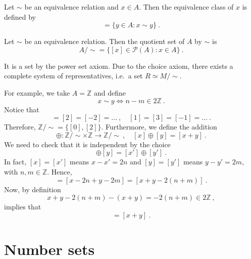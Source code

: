     \begin{definition}
        Let $\sim$ be an equivalence relation and $x \in A$. Then the equivalence class of $x$ is defined by 
        \begin{equation*}
            [x] = \{y \in A \colon x \sim y \} ~.
        \end{equation*}
    \end{definition}

    \begin{definition}
        Let $\sim$ be an equivalence relation. Then the quotient set of $A$ by $\sim$ is 
        \begin{equation*}
            A / \sim = \{[x] \in \mathcal P(A) \colon x \in A \} ~.
        \end{equation*}
    \end{definition}

    It is a set by the power set axiom. Due to the choice axiom, there exists a complete system of representatives, i.e.~a set $R \simeq M / \sim$.

    For example, we take $A = \mathbb Z$ and define 
    \begin{equation*}
        x \sim y \Leftrightarrow n - m \in 2 \mathbb Z ~.
    \end{equation*}
    Notice that 
    \begin{equation*}
        [0] = [2] = [-2] = \ldots ~, \quad [1] = [3] = [-1] = \ldots ~.
    \end{equation*}
    Therefore, $\mathbb Z / \sim = \{[0], [2]\}$. Furthermore, we define the addition 
    \begin{equation*}
        \oplus \colon \mathbb Z / \sim \times \mathbb Z \rightarrow \mathbb Z / \sim ~, \quad [x] \oplus [y] = [x+y] ~.
    \end{equation*}
    We need to check that it is independent by the choice 
    \begin{equation*}
        [x] \oplus [y] = [x'] \oplus [y'] ~. 
    \end{equation*}
    In fact, $[x] = [x']$ means $x-x' = 2n$ and $[y] = [y']$ means $y-y' = 2m$, with $n, m \in \mathbb Z$. Hence, 
    \begin{equation*}
        [x'+y'] = [x - 2n + y - 2m] = [x+y - 2 (n + m)] ~.
    \end{equation*}
    Now, by definition 
    \begin{equation*}
        x+y - 2 (n + m) - (x+y) = - 2 (n + m) \in 2 \mathbb Z ~,
    \end{equation*}
    implies that 
    \begin{equation*}
        [x'+y'] = [x+y] ~.
    \end{equation*}

\section{Number sets}

    